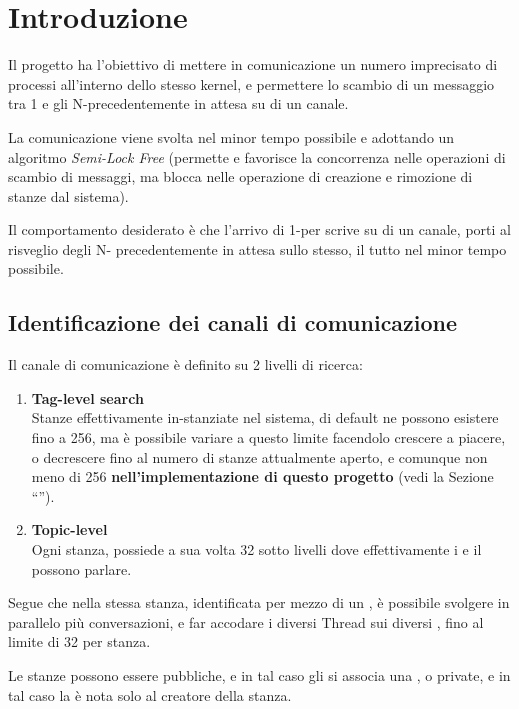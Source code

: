 \section{Introduzione}

Il progetto ha l'obiettivo di mettere in comunicazione un numero imprecisato di processi all'interno dello stesso
kernel, e permettere lo scambio di un messaggio tra 1 \Writer e gli N-\Reader precedentemente in attesa su di un canale.

La comunicazione viene svolta nel minor tempo possibile e adottando un algoritmo \textit{Semi-Lock Free} (permette e
favorisce la concorrenza nelle operazioni di scambio di messaggi, ma blocca nelle operazione di creazione e rimozione
di stanze dal sistema).

Il comportamento desiderato è che l'arrivo di 1-\Writer per scrive su di un canale, porti al risveglio degli N-\Reader
precedentemente in attesa sullo stesso, il tutto nel minor tempo possibile.

\subsection{Identificazione dei canali di comunicazione}
Il canale di comunicazione è definito su 2 livelli di ricerca:
\begin{enumerate}
    \item \textbf{Tag-level search} \\
    Stanze effettivamente in-stanziate nel sistema, di default ne possono esistere fino a 256,
    ma è possibile variare a \RunTime questo limite facendolo crescere a piacere, o decrescere fino al
    numero di stanze attualmente aperto, e comunque non meno di 256 \textbf{nell'implementazione di questo progetto}
    (vedi la Sezione ``'').
    \item \textbf{Topic-level} \\
    Ogni stanza, possiede a sua volta 32 sotto livelli dove effettivamente i \Reader e il \Writer  possono parlare.
\end{enumerate}

Segue che nella stessa stanza, identificata per mezzo di un \tagSys, è possibile svolgere in parallelo più
conversazioni, e far accodare i diversi Thread sui diversi \Topic, fino al limite di 32 \Topic per
stanza.

Le stanze possono essere pubbliche, e in tal caso gli si associa una \keySys, o private, e in tal caso la \tagSys è
nota solo al creatore della stanza.

